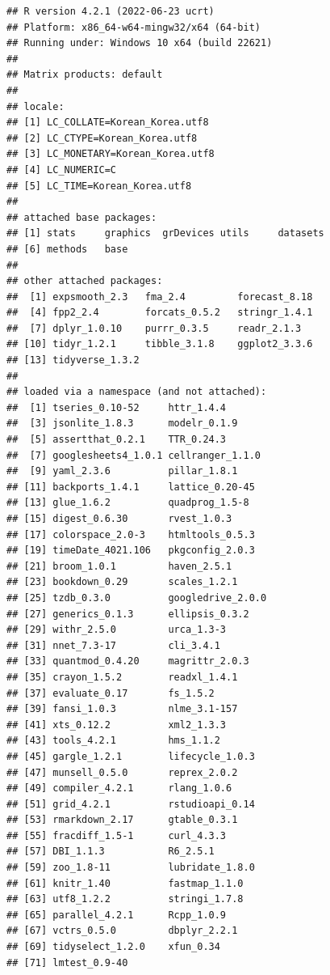 \documentclass[
]{book}
\begin{document}
\begin{verbatim}
## R version 4.2.1 (2022-06-23 ucrt)
## Platform: x86_64-w64-mingw32/x64 (64-bit)
## Running under: Windows 10 x64 (build 22621)
## 
## Matrix products: default
## 
## locale:
## [1] LC_COLLATE=Korean_Korea.utf8 
## [2] LC_CTYPE=Korean_Korea.utf8   
## [3] LC_MONETARY=Korean_Korea.utf8
## [4] LC_NUMERIC=C                 
## [5] LC_TIME=Korean_Korea.utf8    
## 
## attached base packages:
## [1] stats     graphics  grDevices utils     datasets 
## [6] methods   base     
## 
## other attached packages:
##  [1] expsmooth_2.3   fma_2.4         forecast_8.18  
##  [4] fpp2_2.4        forcats_0.5.2   stringr_1.4.1  
##  [7] dplyr_1.0.10    purrr_0.3.5     readr_2.1.3    
## [10] tidyr_1.2.1     tibble_3.1.8    ggplot2_3.3.6  
## [13] tidyverse_1.3.2
## 
## loaded via a namespace (and not attached):
##  [1] tseries_0.10-52     httr_1.4.4         
##  [3] jsonlite_1.8.3      modelr_0.1.9       
##  [5] assertthat_0.2.1    TTR_0.24.3         
##  [7] googlesheets4_1.0.1 cellranger_1.1.0   
##  [9] yaml_2.3.6          pillar_1.8.1       
## [11] backports_1.4.1     lattice_0.20-45    
## [13] glue_1.6.2          quadprog_1.5-8     
## [15] digest_0.6.30       rvest_1.0.3        
## [17] colorspace_2.0-3    htmltools_0.5.3    
## [19] timeDate_4021.106   pkgconfig_2.0.3    
## [21] broom_1.0.1         haven_2.5.1        
## [23] bookdown_0.29       scales_1.2.1       
## [25] tzdb_0.3.0          googledrive_2.0.0  
## [27] generics_0.1.3      ellipsis_0.3.2     
## [29] withr_2.5.0         urca_1.3-3         
## [31] nnet_7.3-17         cli_3.4.1          
## [33] quantmod_0.4.20     magrittr_2.0.3     
## [35] crayon_1.5.2        readxl_1.4.1       
## [37] evaluate_0.17       fs_1.5.2           
## [39] fansi_1.0.3         nlme_3.1-157       
## [41] xts_0.12.2          xml2_1.3.3         
## [43] tools_4.2.1         hms_1.1.2          
## [45] gargle_1.2.1        lifecycle_1.0.3    
## [47] munsell_0.5.0       reprex_2.0.2       
## [49] compiler_4.2.1      rlang_1.0.6        
## [51] grid_4.2.1          rstudioapi_0.14    
## [53] rmarkdown_2.17      gtable_0.3.1       
## [55] fracdiff_1.5-1      curl_4.3.3         
## [57] DBI_1.1.3           R6_2.5.1           
## [59] zoo_1.8-11          lubridate_1.8.0    
## [61] knitr_1.40          fastmap_1.1.0      
## [63] utf8_1.2.2          stringi_1.7.8      
## [65] parallel_4.2.1      Rcpp_1.0.9         
## [67] vctrs_0.5.0         dbplyr_2.2.1       
## [69] tidyselect_1.2.0    xfun_0.34          
## [71] lmtest_0.9-40
\end{verbatim}
\end{document}
